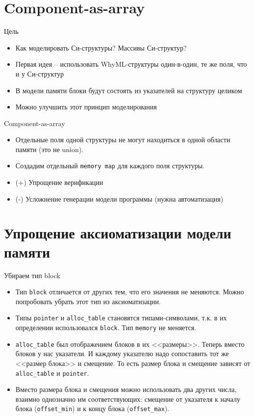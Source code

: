 \documentclass[hyperref={unicode=true}]{beamer}
\begin{document}
    \section{Component-as-array}

    \begin{frame}{Цель}
    \begin{itemize}
    \item Как моделировать Си-структуры? Массивы Си-структур?
    \item Первая идея -- использовать WhyML-структуры один-в-один,
    те же поля, что и у Си-структур
    \item В модели памяти блоки будут состоять из указателей на
    структуру целиком
    \item Можно улучшить этот принцип моделирования
    \end{itemize}
    \end{frame}

    \begin{frame}{Component-as-array}
    \begin{itemize}
    \item Отдельные поля одной структуры не могут
    находиться в одной области памяти (это не union).
    \item Создадим отдельный \texttt{memory map} для
    каждого поля структуры.
    \item (+) Упрощение верификации
    \item (-) Усложнение генерации модели программы (нужна
            автоматизация)
    \end{itemize}
    \end{frame}

    \section{Упрощение аксиоматизации модели памяти}

    \begin{frame}{Убираем тип block}
    \begin{itemize}
    \item
    Тип \texttt{block} отличается от других тем, что
    его значения не меняются. Можно попробовать убрать
    этот тип из аксиоматизации.
    \item
    Типы \texttt{pointer} и \texttt{alloc\_table}
    становятся типами-символами, т.к. в их определении
    использовался \texttt{block}. Тип \texttt{memory}
    не меняется.
    \item
    \texttt{alloc\_table} был отображением блоков в их
    <<размеры>>. Теперь вместо блоков у нас указатели.
    И каждому указателю надо сопоставить тот же <<размер
    блока>> и смещение. То есть размер блока и смещение
    зависят от \texttt{alloc\_table} и \texttt{pointer}.
    \item
    Вместо размера блока и смещения можно использовать
    два других числа, взаимно однозначно им соответствующих:
    смещение от указателя к началу блока (\texttt{offset\_min})
    и к концу блока (\texttt{offset\_max}).
    \end{itemize}
    \end{frame}
\end{document}
